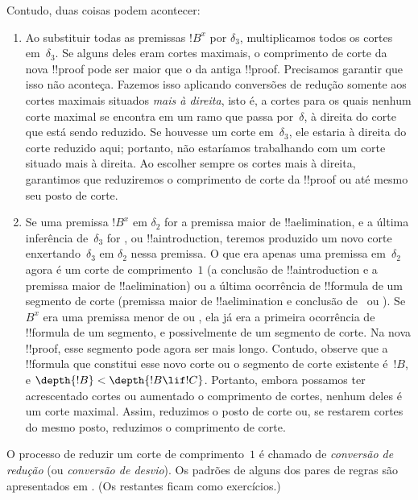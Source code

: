 \documentclass[../../../include/open-logic-section]{subfiles}
\begin{document}
Contudo, duas coisas podem acontecer:
\begin{enumerate}
  \item Ao substituir todas as premissas $!B^x$ por $\delta_3$,
  multiplicamos todos os cortes em~$\delta_3$. Se alguns deles eram
  cortes maximais, o comprimento de corte da nova !!{proof} pode ser
  maior que o da antiga !!{proof}. Precisamos garantir que isso não
  aconteça. Fazemos isso aplicando conversões de redução somente aos
  cortes maximais situados \emph{mais à direita}, isto é, a cortes para
  os quais nenhum corte maximal se encontra em um ramo que passa
  por~$\delta$, à direita do corte que está sendo reduzido. Se houvesse
  um corte em~$\delta_3$, ele estaria à direita do corte reduzido aqui;
  portanto, não estaríamos trabalhando com um corte situado mais à
  direita. Ao escolher sempre os cortes mais à direita, garantimos que
  reduziremos o comprimento de corte da !!{proof} ou até mesmo seu posto
  de corte.
  \item Se uma premissa $!B^x$ em $\delta_2$ for a premissa maior de
  !!a{elimination}, e a última inferência de~$\delta_3$ for
  \Elim{\lor}, \Elim{\lexists} ou !!a{introduction}, teremos produzido
  um novo corte enxertando~$\delta_3$ em $\delta_2$ nessa premissa. O
  que era apenas uma premissa em~$\delta_2$ agora é um corte de
  comprimento~$1$ (a conclusão de !!a{introduction} e a premissa maior
  de !!a{elimination}) ou a última ocorrência de !!{formula} de um
  segmento de corte (premissa maior de !!a{elimination} e conclusão
  de~\Elim{\lor} ou \Elim{\lexists}). Se $B^x$ era uma premissa menor
  de \Elim{\lor} ou \Elim{\lexists}, ela já era a primeira ocorrência
  de !!{formula} de um segmento, e possivelmente de um segmento de
  corte. Na nova !!{proof}, esse segmento pode agora ser mais longo.
  Contudo, observe que a !!{formula} que constitui esse novo corte ou o
  segmento de corte existente é~$!B$, e $\depth{!B} < \depth{!B \lif
  !C}$. Portanto, embora possamos ter acrescentado cortes ou aumentado
  o comprimento de cortes, nenhum deles é um corte maximal. Assim,
  reduzimos o posto de corte ou, se restarem cortes do mesmo posto,
  reduzimos o comprimento de corte.
\end{enumerate}

O processo de reduzir um corte de comprimento~$1$ é chamado de
\emph{conversão de redução} (ou \emph{conversão de desvio}). Os padrões
de alguns dos pares de regras são apresentados em
. (Os restantes ficam como exercícios.)
\end{document}
